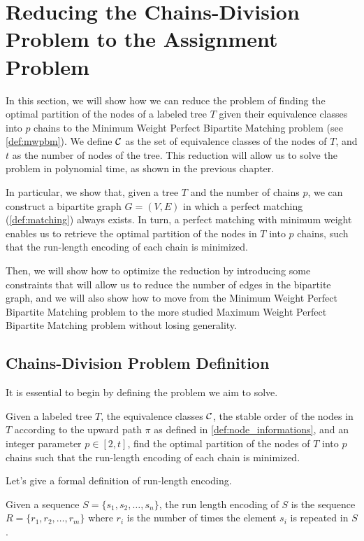 \section{Reducing the Chains-Division Problem to the Assignment Problem}
In this section, we will show how we can reduce the problem of finding the optimal partition of the nodes of a labeled tree $T$ given their equivalence classes into $p$ chains to the Minimum Weight Perfect Bipartite Matching problem (see \cref{def:mwpbm}). We define $\mathcal{C}$ as the set of equivalence classes of the nodes of $T$, and $t$ as the number of nodes of the tree. This reduction will allow us to solve the problem in polynomial time, as shown in the previous chapter.

In particular, we show that, given a tree $T$ and the number of chains $p$, we can construct a bipartite graph $G = (V, E)$ in which a perfect matching (\cref{def:matching}) always exists. In turn, a perfect matching with minimum weight enables us to retrieve the optimal partition of the nodes in $T$ into $p$ chains, such that the run-length encoding of each chain is minimized.

Then, we will show how to optimize the reduction by introducing some constraints that will allow us to reduce the number of edges in the bipartite graph, and we will also show how to move from the Minimum Weight Perfect Bipartite Matching problem to the more studied Maximum Weight Perfect Bipartite Matching problem without losing generality.

\subsection{Chains-Division Problem Definition}
It is essential to begin by defining the problem we aim to solve.

\begin{definition} \label{def:problem_def}
    Given a labeled tree $T$, the equivalence classes $\mathcal{C}$, the stable order of the nodes in $T$ according to the upward path $\pi$ as defined in \cref{def:node_informations}, and an integer parameter $p \in [2, t]$, find the optimal partition of the nodes of $T$ into $p$ chains such that the run-length encoding of each chain is minimized.
\end{definition}

Let's give a formal definition of run-length encoding.
\begin{definition}
    Given a sequence $S = \{s_1, s_2, \dots, s_n\}$, the run length encoding of $S$ is the sequence $R = \{r_1, r_2, \dots, r_m\}$ where $r_i$ is the number of times the element $s_i$ is repeated in $S$.
\end{definition}

